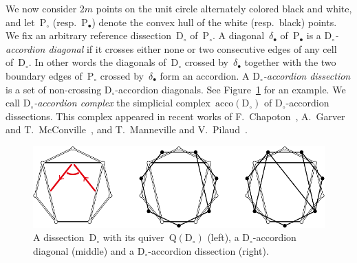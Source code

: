 \documentclass{amsart}
\theoremstyle{definition}
\newcommand{\fref}[1]{Figure~\ref{#1}} %
\newcommand{\darkblue}{\color{darkblue}} %
\newcommand{\defn}[1]{\textsl{\darkblue #1}} %
\newcommand{\acco}{\mathrm{acco}} %
\newcommand{\polygon}{\mathrm{P}} %
\newcommand{\dissection}{\mathrm{D}} %
\newcommand{\sign}[3]{\varepsilon \big( {#1} \in {#2}\;|\;{#3} \big)} %
\newcommand{\SSS}{\reflectbox{$\mathsf{Z}$}} %
\newcommand{\ZZZ}{\mathsf{Z}} %
\newcommand{\VVV}{{\mathsf{{V \hspace{-.1686cm} I\,}}}} %
\newcommand{\quiver}{\mathrm{Q}} %
\begin{document}
We now consider $2m$ points on the unit circle alternately colored black and white, and let~$\polygon_\circ$ (resp.~$\polygon_\bullet$) denote the convex hull of the white (resp.~black) points.
We fix an arbitrary reference dissection~$\dissection_\circ$ of~$\polygon_\circ$.
A diagonal~$\delta_\bullet$ of~$\polygon_\bullet$ is a \defn{$\dissection_\circ$-accordion diagonal} if it crosses either none or two consecutive edges of any cell of~$\dissection_\circ$.
In other words the diagonals of~$\dissection_\circ$ crossed by~$\delta_\bullet$ together with the two boundary edges of~$\polygon_\circ$ crossed by~$\delta_\bullet$ form an accordion.
A \defn{$\dissection_\circ$-accordion dissection} is a set of non-crossing \mbox{$\dissection_\circ$-accordion} diagonals. 
See \fref{fig:exmAccordionDissections} for an example.
We call \defn{$\dissection_\circ$-accordion complex} the simplicial complex~$\acco(\dissection_\circ)$ of $\dissection_\circ$-accordion dissections.
This complex appeared in recent works of F.~Chapoton~\cite{Chapoton-quadrangulations}, A.~Garver and T.~McConville~\cite{GarverMcConville}, and T.~Manneville and V.~Pilaud~\cite{MannevillePilaud-accordion}.

\begin{figure}
	\capstart
	\centerline{\includegraphics[width=\textwidth]{exmAccordionDissections}}
	\caption{A dissection~$\dissection_\circ$ with its quiver~$\quiver(\dissection_\circ)$ (left), a $\dissection_\circ$-accordion diagonal (middle) and a $\dissection_\circ$-accordion dissection (right).}
	\label{fig:exmAccordionDissections}
\end{figure}

\end{document}
